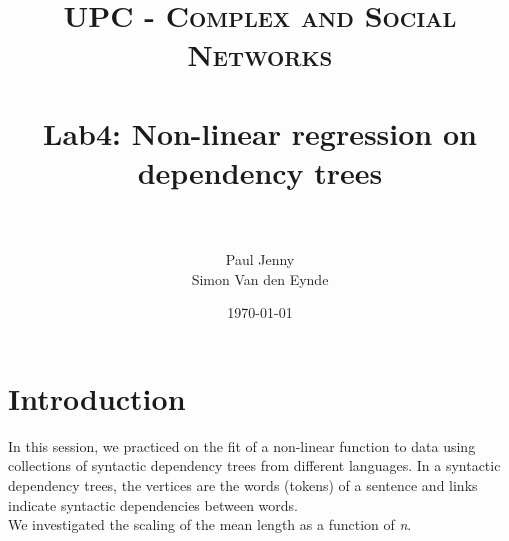 \documentclass[paper=a4, fontsize=11pt]{scrartcl} %
\title{
\normalfont \normalsize
\textsc{UPC - Complex and Social Networks} \\ [25pt] %
\horrule{0.5pt} \\[0.4cm] %
\huge Lab4: Non-linear regression on dependency trees \\ %
\horrule{2pt} \\[0.5cm] %
}
\author{Paul Jenny\\Simon Van den Eynde} %
\date{\normalsize\today} %
\begin{document}
\maketitle %



\section{Introduction}

In this session, we practiced on the fit of a non-linear function to data using collections of syntactic dependency trees from different languages. In a syntactic dependency trees, the vertices are the words (tokens) of a sentence and links indicate syntactic dependencies between words. \\

We investigated the scaling of the mean length as a function of \textit{n}.

\end{document}
